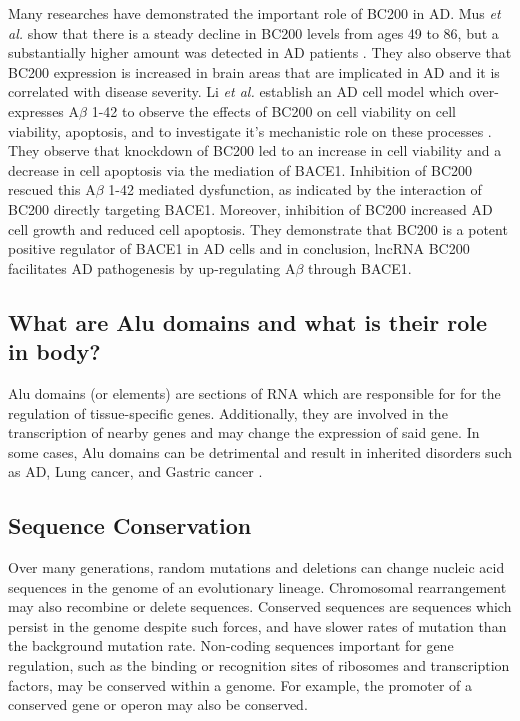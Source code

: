 \documentclass[conference, 11pt]{IEEEtran}
\begin{document}
Many researches have demonstrated the important role of BC200 in AD. 
Mus \emph{et al.} show that there is a steady decline in BC200 levels from ages 49 to 86, but a substantially higher amount was detected in AD patients \cite{mus2007dendritic}. 
They also observe that BC200 expression is increased in brain areas that are implicated in AD and it is correlated with disease severity. 
Li \emph{et al.} establish an AD cell model which over-expresses A$\beta$ 1-42 to observe the effects of BC200 on cell viability on cell viability, apoptosis, and to investigate it's mechanistic role on these processes \cite{li2018identification}. 
They observe that knockdown of BC200 led to an increase in cell viability and a decrease in cell apoptosis via the mediation of BACE1.
Inhibition of BC200 rescued this A$\beta$ 1-42 mediated dysfunction, as indicated by the interaction of BC200 directly targeting BACE1. 
Moreover, inhibition of BC200 increased AD cell growth and reduced cell apoptosis. 
They demonstrate that BC200 is a potent positive regulator of BACE1 in AD cells and in conclusion, lncRNA BC200 facilitates AD pathogenesis by up-regulating A$\beta$ through BACE1.

\subsection{What are Alu domains and what is their role in body?}

Alu domains (or elements) are sections of RNA which are responsible for for the regulation of tissue-specific genes. 
Additionally, they are involved in the transcription of nearby genes and may change the expression of said gene. 
In some cases,  Alu domains can be detrimental and result in inherited disorders such as AD, Lung cancer, and Gastric cancer \cite{tseng2013oxidative}. 

\subsection{Sequence Conservation}

Over many generations, random mutations and deletions can change nucleic acid sequences in the genome of an evolutionary lineage. 
Chromosomal rearrangement may also recombine or delete sequences. 
Conserved sequences are sequences which persist in the genome despite such forces, and have slower rates of mutation than the background mutation rate\cite{kimura1974some}. 
Non-coding sequences important for gene regulation, such as the binding or recognition sites of ribosomes and transcription factors, may be conserved within a genome. For example, the promoter of a conserved gene or operon may also be conserved.
\end{document}
